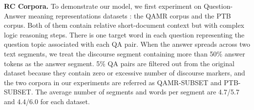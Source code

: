 \textbf{RC Corpora.}
To demonstrate our model, we first experiment on Question-Answer meaning representations datasets \cite{DBLP:conf/naacl/MichaelSHDZ18}: the QAMR corpus and the PTB corpus. Both of them contain relative short-document context but with complex logic reasoning steps. 
There is one target word in each question representing the question topic associated with each QA pair. %
When the answer spreads across two text segments, we treat the discourse segment containing more than 50\% answer tokens as the answer segment.
5\% QA pairs are filtered out from the original dataset because they contain zero  or excessive number of discourse markers, and the two corpora in our experiments are referred as \textsc{QAMR-SUBSET} and \textsc{PTB-SUBSET}. The average number of segments and words per segment are 4.7/5.7 and 4.4/6.0 for each dataset.

